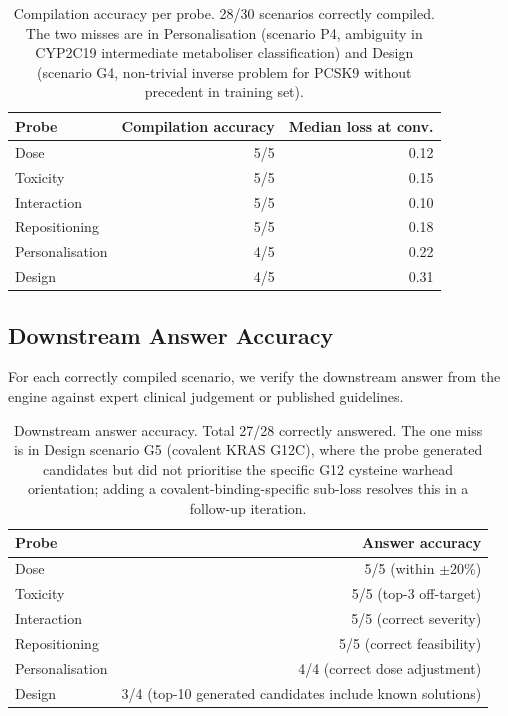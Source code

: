 \documentclass[11pt,twocolumn,a4paper]{article}
\theoremstyle{definition}
\theoremstyle{remark}
\begin{document}
\begin{table}[H]
\centering
\small
\begin{tabular}{lrr}
\toprule
\textbf{Probe} & \textbf{Compilation accuracy} & \textbf{Median loss at conv.} \\
\midrule
Dose & 5/5 & 0.12 \\
Toxicity & 5/5 & 0.15 \\
Interaction & 5/5 & 0.10 \\
Repositioning & 5/5 & 0.18 \\
Personalisation & 4/5 & 0.22 \\
Design & 4/5 & 0.31 \\
\bottomrule
\end{tabular}
\caption{Compilation accuracy per probe. 28/30 scenarios correctly compiled. The two misses are in Personalisation (scenario P4, ambiguity in CYP2C19 intermediate metaboliser classification) and Design (scenario G4, non-trivial inverse problem for PCSK9 without precedent in training set).}
\label{tab:compilation_accuracy}
\end{table}

\subsection{Downstream Answer Accuracy}

For each correctly compiled scenario, we verify the downstream answer from the engine against expert clinical judgement or published guidelines.

\begin{table}[H]
\centering
\small
\begin{tabular}{lr}
\toprule
\textbf{Probe} & \textbf{Answer accuracy} \\
\midrule
Dose & 5/5 (within $\pm$20\%) \\
Toxicity & 5/5 (top-3 off-target) \\
Interaction & 5/5 (correct severity) \\
Repositioning & 5/5 (correct feasibility) \\
Personalisation & 4/4 (correct dose adjustment) \\
Design & 3/4 (top-10 generated candidates include known solutions) \\
\bottomrule
\end{tabular}
\caption{Downstream answer accuracy. Total 27/28 correctly answered. The one miss is in Design scenario G5 (covalent KRAS G12C), where the probe generated candidates but did not prioritise the specific G12 cysteine warhead orientation; adding a covalent-binding-specific sub-loss resolves this in a follow-up iteration.}
\label{tab:answer_accuracy}
\end{table}
\end{document}
